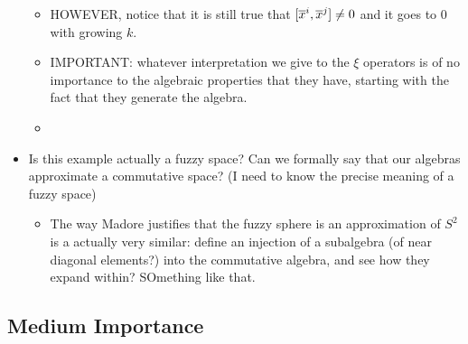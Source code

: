 \begin{itemize}
\begin{itemize}
        \item HOWEVER, notice that it is still true that $[\overline{x}^i, \overline{x}^j] \neq 0 $ and it goes to $0$ with growing $k$.
        
        \item IMPORTANT: whatever interpretation we give to the $\xi$ operators is of no importance to the algebraic properties that they have, starting with the fact that they generate the algebra. 
        
        \item 
        
        \end{itemize}
    
    \item Is this example actually a fuzzy space? Can we formally say that our algebras approximate a commutative space? (I need to know the precise meaning of a fuzzy space)
    
        \begin{itemize}
            
        \item The way Madore justifies that the fuzzy sphere is an approximation of $S^2$ is a actually very similar: define an injection of a subalgebra (of near diagonal elements?) into the commutative algebra, and see how they expand within? SOmething like that.
            
        \end{itemize}
    
    \end{itemize}

\subsection{Medium Importance}

